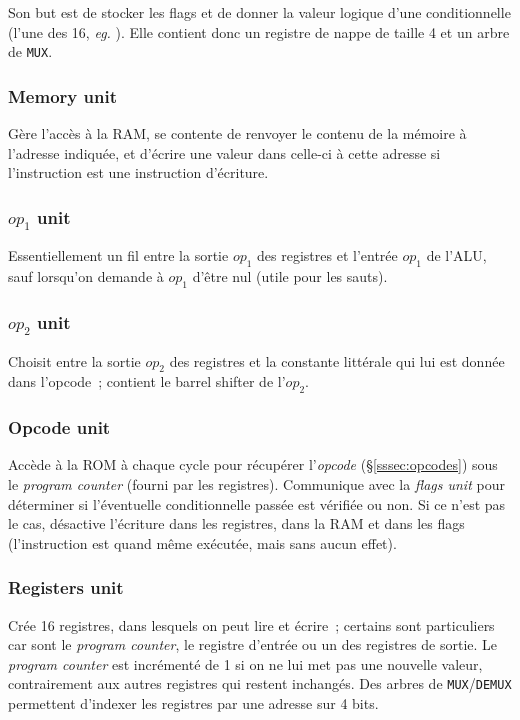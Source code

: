 \documentclass[11pt,a4paper]{article}
\newcommand{\acronym}[1]{\MakeUppercase{#1}}
\begin{document}
Son but est de stocker les flags et de donner la valeur logique d'une conditionnelle (l'une des 16, \textit{eg.} ). Elle contient donc un registre de nappe de taille 4 et un arbre de \texttt{MUX}.

\subsubsection{Memory unit} \label{sssec:procunit_mem}

Gère l'accès à la \acronym{ram}, se contente de renvoyer le contenu de
la mémoire à l'adresse indiquée, et d'écrire une valeur dans celle-ci
à cette adresse si l'instruction est une instruction d'écriture.

\subsubsection{$op_1$ unit}
Essentiellement un fil entre la sortie $op_1$ des registres et l'entrée $op_1$ de l'ALU, sauf lorsqu'on demande à $op_1$ d'être nul (utile pour les sauts).

\subsubsection{$op_2$ unit}
Choisit entre la sortie $op_2$ des registres et la constante littérale qui lui est donnée dans l'opcode~; contient le barrel shifter de l'$op_2$.

\subsubsection{Opcode unit} \label{sssec:procunit_opcode}
Accède à la ROM à chaque cycle pour récupérer l'\textit{opcode} (§\ref{sssec:opcodes}) sous le \textit{program counter} (fourni par les registres). Communique avec la \textit{flags unit} pour déterminer si l'éventuelle conditionnelle passée est vérifiée ou non. Si ce n'est pas le cas, désactive l'écriture dans les registres, dans la RAM et dans les flags (l'instruction est quand même exécutée, mais sans aucun effet).

\subsubsection{Registers unit}

Crée 16 registres, dans lesquels on peut lire et écrire~; certains
sont particuliers car sont le \textit{program counter}, le registre
d'entrée ou un des registres de sortie. Le \textit{program counter}
est incrémenté de 1 si on ne lui met pas une nouvelle valeur,
contrairement aux autres registres qui restent inchangés. Des arbres
de \verb!MUX!/\verb!DEMUX! permettent d'indexer les registres par une
adresse sur 4 bits.
\end{document}
